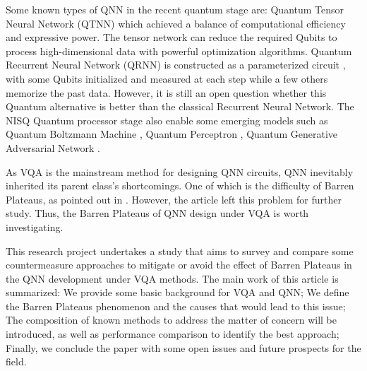 Some known types of QNN in the recent quantum stage are: 
Quantum Tensor Neural Network (QTNN) \cite{hugginsQuantumMachineLearning2019} which achieved a balance of computational efficiency and expressive power. 
The tensor network can reduce the required Qubits to process high-dimensional data with powerful optimization algorithms.
Quantum Recurrent Neural Network (QRNN) is constructed as a parameterized circuit \cite{takakiLearningTemporalData2021}, with some Qubits initialized and measured at each step while a few others memorize the past data.
However, it is still an open question whether this Quantum alternative is better than the classical Recurrent Neural Network.
The NISQ Quantum processor stage also enable some emerging models such as 
Quantum Boltzmann Machine \cite{shinguBoltzmannMachineLearning2021}\cite{zoufalVariationalQuantumBoltzmann2021}, 
Quantum Perceptron \cite{kristensenArtificialSpikingQuantum2021}, 
Quantum Generative Adversarial Network \cite{dallaire-demersQuantumGenerativeAdversarial2018}\cite{lloydQuantumGenerativeAdversarial2018}.

As VQA is the mainstream method for designing QNN circuits, QNN inevitably inherited its parent class's shortcomings.
One of which is the difficulty of Barren Plateaus, as pointed out in \cite{abbasPowerQuantumNeural2021}. However, the article left this problem for further study. Thus, the Barren Plateaus of QNN design under VQA is worth investigating.

This research project undertakes a study that aims to survey and compare some countermeasure approaches to mitigate or avoid the effect of Barren Plateaus in the QNN development under VQA methods. 
The main work of this article is summarized: 
We provide some basic background for VQA and QNN;
We define the Barren Plateaus phenomenon and the causes that would lead to this issue; 
The composition of known methods to address the matter of concern will be introduced, as well as performance comparison to identify the best approach; 
Finally, we conclude the paper with some open issues and future prospects for the field.


